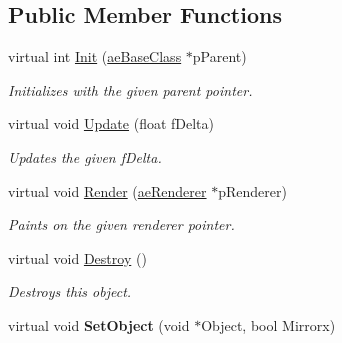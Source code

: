 \subsection*{Public Member Functions}
\begin{DoxyCompactItemize}
\item 
virtual int \hyperlink{class_c_animation_renderer_abf2ab0201171989cf7ad44846cf3e115}{Init} (\hyperlink{classae_base_class}{ae\+Base\+Class} $\ast$p\+Parent)
\begin{DoxyCompactList}\small\item\em Initializes with the given parent pointer. \end{DoxyCompactList}\item 
virtual void \hyperlink{class_c_animation_renderer_a2ac2237cb706d2f6d45a88a86543e008}{Update} (float f\+Delta)
\begin{DoxyCompactList}\small\item\em Updates the given f\+Delta. \end{DoxyCompactList}\item 
virtual void \hyperlink{class_c_animation_renderer_a272f2bac72c90d89a9ada38058fc3f0c}{Render} (\hyperlink{classae_core_1_1ae_renderer}{ae\+Renderer} $\ast$p\+Renderer)
\begin{DoxyCompactList}\small\item\em Paints on the given renderer pointer. \end{DoxyCompactList}\item 
virtual void \hyperlink{class_c_animation_renderer_a4da67eb466b508135fe2ce38538f8ce0}{Destroy} ()\hypertarget{class_c_animation_renderer_a4da67eb466b508135fe2ce38538f8ce0}{}\label{class_c_animation_renderer_a4da67eb466b508135fe2ce38538f8ce0}

\begin{DoxyCompactList}\small\item\em Destroys this object. \end{DoxyCompactList}\item 
virtual void {\bfseries Set\+Object} (void $\ast$Object, bool Mirrorx)\hypertarget{class_c_animation_renderer_a62384e0a387b6aa37ce99448f7b07f4b}{}\label{class_c_animation_renderer_a62384e0a387b6aa37ce99448f7b07f4b}

\end{DoxyCompactItemize}
